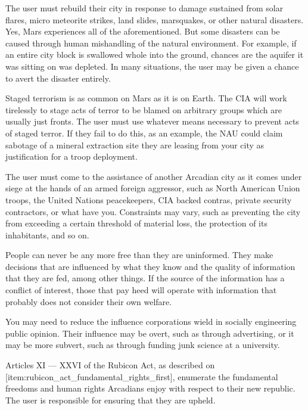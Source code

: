 
The user must rebuild their city in response to damage sustained from solar flares, micro meteorite strikes, land slides, marsquakes, or other natural disasters. Yes, Mars experiences all of the aforementioned. But some  disasters can be caused through human mishandling of the natural environment. For example, if an entire city block is swallowed whole into the ground, chances are the aquifer it was sitting on was depleted. In many situations, the user may be given a chance to avert the disaster entirely.


Staged terrorism is as common on Mars as it is on Earth. The CIA will work tirelessly to stage acts of terror to be blamed on arbitrary groups which are usually just fronts. The user must use whatever means necessary to prevent acts of staged terror. If they fail to do this, as an example, the NAU could claim sabotage of a mineral extraction site they are leasing from your city as justification for a troop deployment.


The user must come to the assistance of another Arcadian city as it comes under siege at the hands of an armed foreign aggressor, such as North American Union troops, the United Nations peacekeepers, CIA backed contras, private security contractors, or what have you. Constraints may vary, such as preventing the city from exceeding a certain threshold of material loss, the protection of its inhabitants, and so on.


People can never be any more free than they are uninformed. They make decisions that are influenced by what they know and the quality of information that they are fed, among other things. If the source of the information has a conflict of interest, those that pay heed will operate with information that probably does not consider their own welfare.

You may need to reduce the influence corporations wield in socially engineering public opinion. Their influence may be overt, such as through advertising, or it may be more subvert, such as through funding junk science at a university.


Articles XI --- XXVI of the Rubicon Act, as described on [item:rubicon_act_fundamental_rights_first], enumerate the fundamental freedoms and human rights Arcadians enjoy with respect to their new republic. The user is responsible for ensuring that they are upheld.

